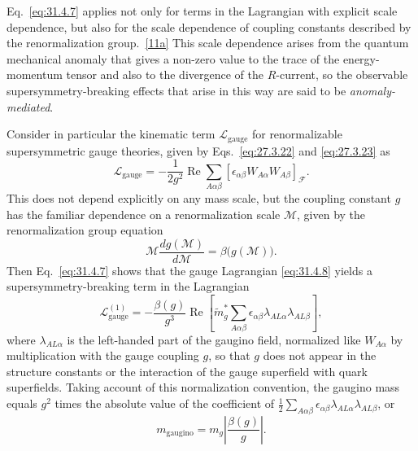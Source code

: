 Eq.~\eqref{eq:31.4.7} applies not only for terms in the Lagrangian with
explicit scale dependence, but also for the scale dependence of coupling
constants described by the renormalization
group.~\hyperref[ch31-ref-11a]{[11a]} This scale dependence arises from the
quantum mechanical anomaly that gives a non-zero value to the trace of the
energy-momentum tensor and also to the divergence of the \(R\)-current, so
the observable supersymmetry-breaking effects that arise in this way are
said to be \emph{anomaly-mediated}.

Consider in particular the kinematic term \(\mathcal L_{\mathrm{gauge}}\)
for renormalizable supersymmetric gauge theories, given by
Eqs.~\eqref{eq:27.3.22} and \eqref{eq:27.3.23} as
\begin{equation}
  \mathcal L_{\mathrm{gauge}}
  =-\frac1{2g^2}\operatorname{Re}
  \sum_{A\alpha\beta}
  [\epsilon_{\alpha\beta}W_{A\alpha}W_{A\beta}]_{\mathcal F}.
  \tag{31.4.8}\label{eq:31.4.8}
\end{equation}
This does not depend explicitly on any mass scale, but the coupling
constant \(g\) has the familiar dependence on a renormalization scale
\(\mathcal M\), given by the renormalization group equation
\begin{equation}
  \mathcal M\frac{dg(\mathcal M)}{d\mathcal M}
  =\beta\bigl(g(\mathcal M)\bigr).
  \tag{31.4.9}\label{eq:31.4.9}
\end{equation}
Then Eq.~\eqref{eq:31.4.7} shows that the gauge Lagrangian
\eqref{eq:31.4.8} yields a supersymmetry-breaking term in the Lagrangian
\begin{equation}
  \mathcal L_{\mathrm{gauge}}^{(1)}
  =-\frac{\beta(g)}{g^3}\operatorname{Re}
  \left[
    \widetilde m_g^*
    \sum_{A\alpha\beta}
    \epsilon_{\alpha\beta}\lambda_{AL\alpha}\lambda_{AL\beta}
  \right],
  \tag{31.4.10}\label{eq:31.4.10}
\end{equation}
where \(\lambda_{AL\alpha}\) is the left-handed part of the gaugino field,
normalized like \(W_{A\alpha}\) by multiplication with the gauge coupling
\(g\), so that \(g\) does not appear in the structure constants or the
interaction of the gauge superfield with quark superfields. Taking account
of this normalization convention, the gaugino mass equals \(g^2\) times
the absolute value of the coefficient of
\(\frac12\sum_{A\alpha\beta}
\epsilon_{\alpha\beta}\lambda_{AL\alpha}\lambda_{AL\beta}\), or
\begin{equation}
  m_{\mathrm{gaugino}}
  =m_g\left|\frac{\beta(g)}{g}\right|.
  \tag{31.4.11}\label{eq:31.4.11}
\end{equation}
